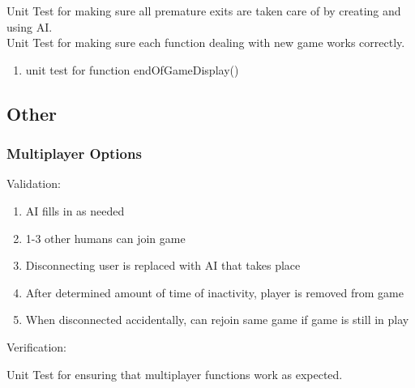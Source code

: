 \documentclass[11pt, titlepage]{article}
\begin{document}
			Unit Test for making sure all premature exits are taken care of by creating and using AI.\\
			Unit Test for making sure each function dealing with new game works correctly.
			\begin{enumerate}
				\item unit test for function endOfGameDisplay()
			\end{enumerate}
		\subsection{Other}
			\subsubsection{Multiplayer Options}
			Validation:
			\begin{enumerate}
				\item AI fills in as needed
				\item 1-3 other humans can join game
				\item Disconnecting user is replaced with AI that takes place
				\item After determined amount of time of inactivity, player is removed from game
				\item When disconnected accidentally, can rejoin same game if game is still in play
			\end{enumerate}
			Verification:

			Unit Test for ensuring that multiplayer functions work as expected.
\end{document}
